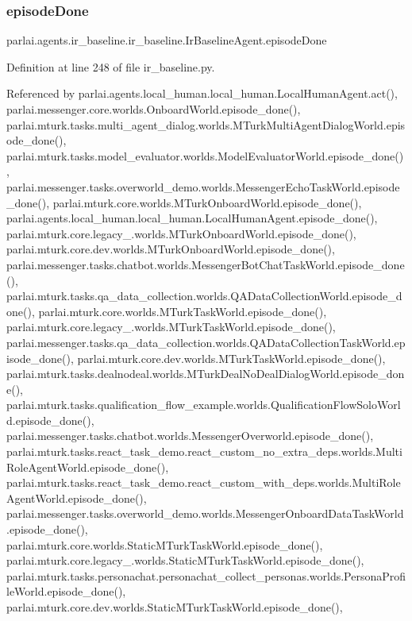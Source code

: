 \subsubsection{\texorpdfstring{episode\+Done}{episodeDone}}
{\footnotesize\ttfamily parlai.\+agents.\+ir\+\_\+baseline.\+ir\+\_\+baseline.\+Ir\+Baseline\+Agent.\+episode\+Done}



Definition at line 248 of file ir\+\_\+baseline.\+py.



Referenced by parlai.\+agents.\+local\+\_\+human.\+local\+\_\+human.\+Local\+Human\+Agent.\+act(), parlai.\+messenger.\+core.\+worlds.\+Onboard\+World.\+episode\+\_\+done(), parlai.\+mturk.\+tasks.\+multi\+\_\+agent\+\_\+dialog.\+worlds.\+M\+Turk\+Multi\+Agent\+Dialog\+World.\+episode\+\_\+done(), parlai.\+mturk.\+tasks.\+model\+\_\+evaluator.\+worlds.\+Model\+Evaluator\+World.\+episode\+\_\+done(), parlai.\+messenger.\+tasks.\+overworld\+\_\+demo.\+worlds.\+Messenger\+Echo\+Task\+World.\+episode\+\_\+done(), parlai.\+mturk.\+core.\+worlds.\+M\+Turk\+Onboard\+World.\+episode\+\_\+done(), parlai.\+agents.\+local\+\_\+human.\+local\+\_\+human.\+Local\+Human\+Agent.\+episode\+\_\+done(), parlai.\+mturk.\+core.\+legacy\+\_.\+worlds.\+M\+Turk\+Onboard\+World.\+episode\+\_\+done(), parlai.\+mturk.\+core.\+dev.\+worlds.\+M\+Turk\+Onboard\+World.\+episode\+\_\+done(), parlai.\+messenger.\+tasks.\+chatbot.\+worlds.\+Messenger\+Bot\+Chat\+Task\+World.\+episode\+\_\+done(), parlai.\+mturk.\+tasks.\+qa\+\_\+data\+\_\+collection.\+worlds.\+Q\+A\+Data\+Collection\+World.\+episode\+\_\+done(), parlai.\+mturk.\+core.\+worlds.\+M\+Turk\+Task\+World.\+episode\+\_\+done(), parlai.\+mturk.\+core.\+legacy\+\_.\+worlds.\+M\+Turk\+Task\+World.\+episode\+\_\+done(), parlai.\+messenger.\+tasks.\+qa\+\_\+data\+\_\+collection.\+worlds.\+Q\+A\+Data\+Collection\+Task\+World.\+episode\+\_\+done(), parlai.\+mturk.\+core.\+dev.\+worlds.\+M\+Turk\+Task\+World.\+episode\+\_\+done(), parlai.\+mturk.\+tasks.\+dealnodeal.\+worlds.\+M\+Turk\+Deal\+No\+Deal\+Dialog\+World.\+episode\+\_\+done(), parlai.\+mturk.\+tasks.\+qualification\+\_\+flow\+\_\+example.\+worlds.\+Qualification\+Flow\+Solo\+World.\+episode\+\_\+done(), parlai.\+messenger.\+tasks.\+chatbot.\+worlds.\+Messenger\+Overworld.\+episode\+\_\+done(), parlai.\+mturk.\+tasks.\+react\+\_\+task\+\_\+demo.\+react\+\_\+custom\+\_\+no\+\_\+extra\+\_\+deps.\+worlds.\+Multi\+Role\+Agent\+World.\+episode\+\_\+done(), parlai.\+mturk.\+tasks.\+react\+\_\+task\+\_\+demo.\+react\+\_\+custom\+\_\+with\+\_\+deps.\+worlds.\+Multi\+Role\+Agent\+World.\+episode\+\_\+done(), parlai.\+messenger.\+tasks.\+overworld\+\_\+demo.\+worlds.\+Messenger\+Onboard\+Data\+Task\+World.\+episode\+\_\+done(), parlai.\+mturk.\+core.\+worlds.\+Static\+M\+Turk\+Task\+World.\+episode\+\_\+done(), parlai.\+mturk.\+core.\+legacy\+\_.\+worlds.\+Static\+M\+Turk\+Task\+World.\+episode\+\_\+done(), parlai.\+mturk.\+tasks.\+personachat.\+personachat\+\_\+collect\+\_\+personas.\+worlds.\+Persona\+Profile\+World.\+episode\+\_\+done(), parlai.\+mturk.\+core.\+dev.\+worlds.\+Static\+M\+Turk\+Task\+World.\+episode\+\_\+done(), 